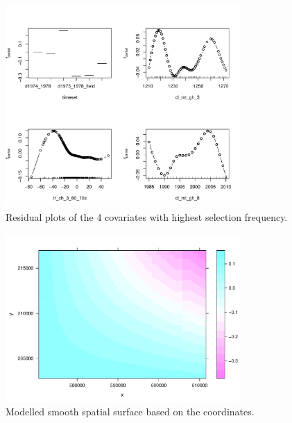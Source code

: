 \documentclass[11pt,a4paper,twoside]{article}\usepackage[]{graphicx}\usepackage[]{color}
\newenvironment{knitrout}{}{} %
\begin{document}
\begin{knitrout}
\color{fgcolor}\begin{figure}

{\centering \includegraphics[width=0.8\textwidth]{figure/gamboost-partial-plots-1} 

}

\caption[Residual plots of the 4 covariates with highest selection frequency]{Residual plots of the 4 covariates with highest selection frequency.}\label{fig:gamboost-partial-plots}
\end{figure}


\end{knitrout}

\begin{knitrout}
\color{fgcolor}\begin{figure}

{\centering \includegraphics[width=0.8\textwidth]{figure/gamboost-partial-plots-spatial-1} 

}

\caption[Modelled smooth spatial surface based on the coordinates]{Modelled smooth spatial surface based on the coordinates.}\label{fig:gamboost-partial-plots-spatial}
\end{figure}


\end{knitrout}
\end{document}
